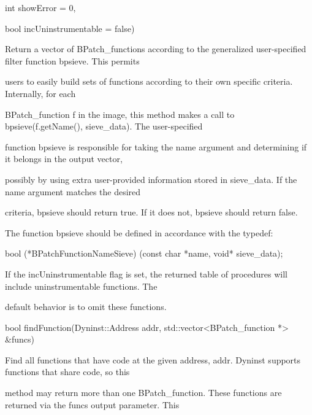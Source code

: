 {{{

int showError = 0,}



{

bool incUninstrumentable = false)}



{

Return a vector of BPatch_functions according to the generalized user-specified filter function bpsieve. This permits

users to easily build sets of functions according to their own specific criteria. Internally, for each

BPatch_function f in the image, this method makes a call to bpsieve(f.getName(), sieve_data). The user-specified

function bpsieve is responsible for taking the name argument and determining if it belongs in the output vector,

possibly by using extra user-provided information stored in sieve_data. If the name argument matches the desired

criteria, bpsieve should return true. If it does not, bpsieve should return false.}



{

The function bpsieve should be defined in accordance with the typedef:}



{

bool (*BPatchFunctionNameSieve) (const char *name, void* sieve_data);}



{

If the incUninstrumentable flag is set, the returned table of procedures will include uninstrumentable functions. The

default behavior is to omit these functions.}





\bigskip



{

bool findFunction(Dyninst::Address addr, std::vector<BPatch_function *> &funcs)}



{

Find all functions that have code at the given address, addr. Dyninst supports functions that share code, so this

method may return more than one BPatch_function. These functions are returned via the funcs output parameter. This

}}}
